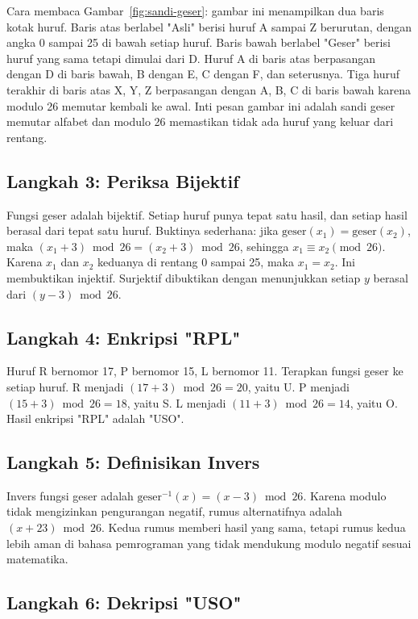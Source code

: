 \documentclass[11pt,a4paper]{article}
\begin{document}
Cara membaca Gambar~\ref{fig:sandi-geser}: gambar ini menampilkan dua baris kotak huruf. Baris atas berlabel "Asli" berisi huruf A sampai Z berurutan, dengan angka 0 sampai 25 di bawah setiap huruf. Baris bawah berlabel "Geser" berisi huruf yang sama tetapi dimulai dari D. Huruf A di baris atas berpasangan dengan D di baris bawah, B dengan E, C dengan F, dan seterusnya. Tiga huruf terakhir di baris atas X, Y, Z berpasangan dengan A, B, C di baris bawah karena modulo 26 memutar kembali ke awal. Inti pesan gambar ini adalah sandi geser memutar alfabet dan modulo 26 memastikan tidak ada huruf yang keluar dari rentang.

\subsection{Langkah 3: Periksa Bijektif}

Fungsi geser adalah bijektif. Setiap huruf punya tepat satu hasil, dan setiap hasil berasal dari tepat satu huruf. Buktinya sederhana: jika $\text{geser}(x_1)=\text{geser}(x_2)$, maka $(x_1+3) \bmod 26=(x_2+3) \bmod 26$, sehingga $x_1 \equiv x_2 \pmod{26}$. Karena $x_1$ dan $x_2$ keduanya di rentang 0 sampai 25, maka $x_1=x_2$. Ini membuktikan injektif. Surjektif dibuktikan dengan menunjukkan setiap $y$ berasal dari $(y-3) \bmod 26$.

\subsection{Langkah 4: Enkripsi "RPL"}

Huruf R bernomor 17, P bernomor 15, L bernomor 11. Terapkan fungsi geser ke setiap huruf. R menjadi $(17+3) \bmod 26=20$, yaitu U. P menjadi $(15+3) \bmod 26=18$, yaitu S. L menjadi $(11+3) \bmod 26=14$, yaitu O. Hasil enkripsi "RPL" adalah "USO".

\subsection{Langkah 5: Definisikan Invers}

Invers fungsi geser adalah $\text{geser}^{-1}(x)=(x-3) \bmod 26$. Karena modulo tidak mengizinkan pengurangan negatif, rumus alternatifnya adalah $(x+23) \bmod 26$. Kedua rumus memberi hasil yang sama, tetapi rumus kedua lebih aman di bahasa pemrograman yang tidak mendukung modulo negatif sesuai matematika.

\subsection{Langkah 6: Dekripsi "USO"}
\end{document}
